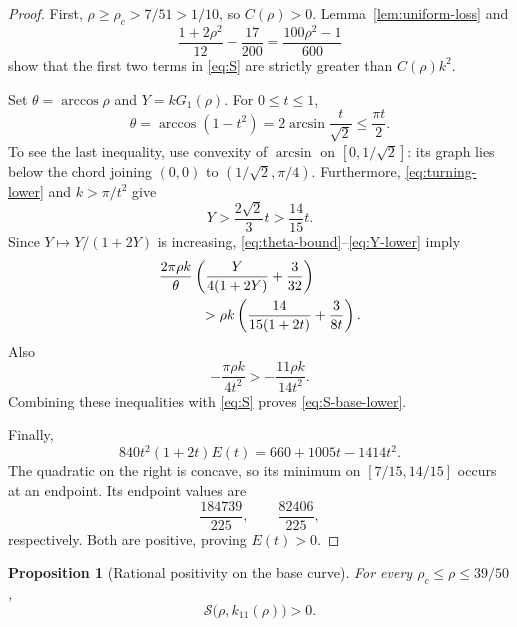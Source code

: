 \documentclass[11pt]{article}
\newtheorem{proposition}[theorem]{Proposition}
\theoremstyle{remark}
\begin{document}
\begin{proof}
First, \(\rho\geq\rho_c>7/51>1/10\), so \(C(\rho)>0\).
Lemma~\ref{lem:uniform-loss} and
\[
 \frac{1+2\rho^2}{12}-\frac{17}{200}
 =\frac{100\rho^2-1}{600}
 \]
show that the first two terms in \eqref{eq:S} are strictly greater
than \(C(\rho)k^2\).

Set \(\theta=\arccos\rho\) and \(Y=kG_1(\rho)\).
For \(0\leq t\leq1\),
\begin{equation}
 \theta=\arccos(1-t^2)
 =2\arcsin\frac{t}{\sqrt2}
 \leq\frac{\pi t}{2}.
 \label{eq:theta-bound}
\end{equation}
To see the last inequality, use convexity of \(\arcsin\) on
\([0,1/\sqrt2]\): its graph lies below the chord joining
\((0,0)\) to \((1/\sqrt2,\pi/4)\).
Furthermore, \eqref{eq:turning-lower} and
\(k>\pi/t^2\) give
\begin{equation}
 Y>
 \frac{2\sqrt2}{3}t
 >\frac{14}{15}t.
 \label{eq:Y-lower}
\end{equation}
Since \(Y\mapsto Y/(1+2Y)\) is increasing,
\eqref{eq:theta-bound}--\eqref{eq:Y-lower} imply
\begin{align}
 &\frac{2\pi\rho k}{\theta}
 \left(\frac{Y}{4(1+2Y)}+\frac3{32}\right)\notag\\
 &\qquad\quad>
 \rho k\left(
 \frac{14}{15(1+2t)}+\frac{3}{8t}
 \right).
 \label{eq:endpoint-lower}
\end{align}
Also
\[
 -\frac{\pi\rho k}{4t^2}>
 -\frac{11\rho k}{14t^2}.
 \]
Combining these inequalities with \eqref{eq:S} proves
\eqref{eq:S-base-lower}.

Finally,
\begin{equation}
 840t^2(1+2t)E(t)
 =660+1005t-1414t^2.
 \label{eq:E-numerator}
\end{equation}
The quadratic on the right is concave, so its minimum on
\([7/15,14/15]\) occurs at an endpoint.  Its endpoint values are
\[
 \frac{184739}{225},
 \qquad
 \frac{82406}{225},
 \]
respectively.  Both are positive, proving \(E(t)>0\).
\end{proof}

\begin{proposition}[Rational positivity on the base curve]
\label{prop:base-positive}
For every \(\rho_c\leq\rho\leq39/50\),
\begin{equation}
 \mathcal S\bigl(\rho,k_{11}(\rho)\bigr)>0.
 \label{eq:base-positive}
\end{equation}
\end{proposition}
\end{document}
